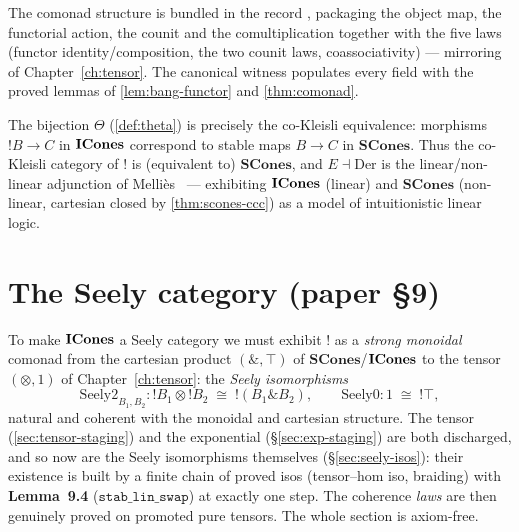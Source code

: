 \begin{definition}\label{def:comonad-record}
\rocqok
{}\rocqok
{}
The comonad structure is bundled in the record
, packaging the object map, the
functorial action, the counit and the comultiplication together with
the five laws (functor identity/composition, the two counit laws,
coassociativity) --- mirroring  of
Chapter~\ref{ch:tensor}. The canonical witness
 populates every field with the
proved lemmas of \autoref{lem:bang-functor} and \autoref{thm:comonad}.
\end{definition}

\begin{remark}
The bijection $\Theta$ (\autoref{def:theta}) is precisely the
co-Kleisli equivalence: morphisms $\mathord{!}B \to C$ in $\mathbf{ICones}$
correspond to stable maps $B \to C$ in $\mathbf{SCones}$. Thus the
co-Kleisli category of $\mathord{!}$ is (equivalent to)
$\mathbf{SCones}$, and $E \dashv \mathrm{Der}$ is the linear/non-linear
adjunction of Melli\`es~\cite{mellies-categorical-semantics} ---
exhibiting $\mathbf{ICones}$ (linear) and $\mathbf{SCones}$ (non-linear,
cartesian closed by \autoref{thm:scones-ccc}) as a model of
intuitionistic linear logic.
\end{remark}

\section{The Seely category (paper \S9)}\label{sec:seely}

To make $\mathbf{ICones}$ a Seely category we must exhibit $\mathord{!}$ as a
\emph{strong monoidal} comonad from the cartesian product
$(\mathbin{\&}, \top)$ of $\mathbf{SCones}$/$\mathbf{ICones}$ to the tensor
$(\otimes, 1)$ of Chapter~\ref{ch:tensor}: the \emph{Seely
isomorphisms}
\[
  \mathrm{Seely2}_{B_1,B_2} : \mathord{!}B_1 \otimes \mathord{!}B_2
  \;\cong\; \mathord{!}(B_1 \mathbin{\&} B_2),
  \qquad
  \mathrm{Seely0} : 1 \;\cong\; \mathord{!}\top,
\]
natural and coherent with the monoidal and cartesian structure. The
tensor (\autoref{sec:tensor-staging}) and the exponential
(\S\ref{sec:exp-staging}) are both discharged, and so now are the Seely
isomorphisms themselves (\S\ref{sec:seely-isos}): their existence is
built by a finite chain of proved isos (tensor--hom iso, braiding) with
\textbf{Lemma~9.4} ($\texttt{stab\_lin\_swap}$) at exactly one step. The
coherence \emph{laws} are then genuinely proved on promoted pure
tensors. The whole section is axiom-free.

